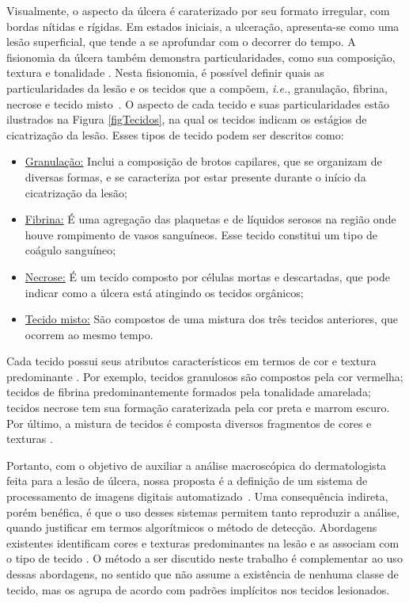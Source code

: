 Visualmente, o aspecto da úlcera é caraterizado por seu formato irregular, com bordas nítidas e rígidas. 
Em estados iniciais, a ulceração, apresenta-se como uma lesão superficial, que tende a se aprofundar com o decorrer do tempo.
A fisionomia da úlcera também demonstra particularidades, como sua composição, textura e tonalidade \cite{Dorileo2010}. 
Nesta fisionomia, é possível definir quais as particularidades da lesão e os tecidos que a compõem, \textit{i.e.}, granulação, fibrina, necrose e tecido misto~\cite{Pereyra2014}. 
O aspecto de cada tecido e suas particularidades estão ilustrados na Figura \ref{figTecidos}, na qual os tecidos indicam os estágios de cicatrização da lesão. 
Esses tipos de tecido podem ser descritos como: 

\begin{itemize}
\item \underline{Granulação:} Inclui a composição de brotos capilares, que se organizam de diversas formas, e se caracteriza por estar presente durante o início da cicatrização da lesão; 

\item \underline{Fibrina:} É uma agregação das plaquetas e de líquidos serosos na região onde houve rompimento de vasos sanguíneos.
Esse tecido constitui um tipo de coágulo sanguíneo; 

\item \underline{Necrose:} É um tecido composto por células mortas e descartadas, que pode indicar como a úlcera está atingindo os tecidos orgânicos;

\item \underline{Tecido misto:} São compostos de uma mistura dos três tecidos anteriores, que ocorrem ao mesmo tempo.
\end{itemize}


Cada tecido possui seus atributos característicos em termos de cor e textura predominante \cite{Pereira2011}.
Por exemplo, tecidos granulosos são compostos pela cor vermelha; tecidos de fibrina predominantemente formados pela tonalidade amarelada; tecidos necrose tem sua formação caraterizada pela cor preta e marrom escuro. Por último, a mistura de tecidos é composta diversos fragmentos de cores e texturas \cite{Chino2018}.   

Portanto, com o objetivo de auxiliar a análise macroscópica do dermatologista feita para a lesão de úlcera, nossa proposta é a definição de um sistema de processamento de imagens digitais automatizado~\cite{Gonzalez2008}.
Uma consequência indireta, porém benéfica, é que o uso desses sistemas permitem tanto reproduzir a análise, quando justificar em termos algorítmicos o método de detecção.
Abordagens existentes identificam cores e texturas predominantes na lesão e as associam com o tipo de tecido \cite{Chino2018,Blanco2016}.
O método a ser discutido neste trabalho é complementar ao uso dessas abordagens, no sentido que não assume a existência de nenhuma classe de tecido, mas os agrupa de acordo com padrões implícitos nos tecidos lesionados.


